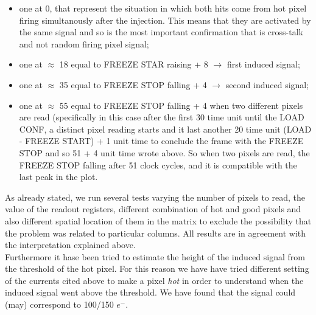 \begin{itemize}
\item one at 0, that represent the situation in which both hits come from hot pixel firing simultanously after the injection. This means that they are activated by the same signal and so is the most important confirmation that is cross-talk and not random firing pixel signal;
\item one at $\approx$ 18 equal to \textsc{FREEZE STAR} raising + 8 $\rightarrow$ first induced signal;
\item one at $\approx$ 35 equal to \textsc{FREEZE STOP} falling + 4 $\rightarrow$ second induced signal;
\item one at $\approx$ 55 equal to \textsc{FREEZE STOP} falling + 4 when two different pixels are read (specifically in this case after the first 30 time unit until the \textsc{LOAD CONF}, a distinct pixel reading starts and it last another 20 time unit (\textsc{LOAD} - \textsc{FREEZE START}) + 1 unit time to conclude the frame with the \textsc{FREEZE STOP} and so 51 + 4 unit time wrote above. So when two pixels are read, the \textsc{FREEZE STOP} falling after 51 clock cycles, and it is compatible with the last peak in the plot.
\end{itemize}



As already stated, we run several tests varying the number of pixels to read, the value of the readout registers, different combination of hot and good pixels and also different spatial location of them in the matrix to exclude the possibility that the problem was related to particular columns. All results are in agreement with the interpretation explained above.\\

Furthermore it hase been tried to estimate the height of the induced signal from the threshold of the hot pixel. For this reason we have have tried different setting of the currents cited above to make a pixel \textit{hot} in order to understand when the induced signal went above the threshold. We have found that the signal could (may) correspond to 100/150 $e^{-}$.\\


